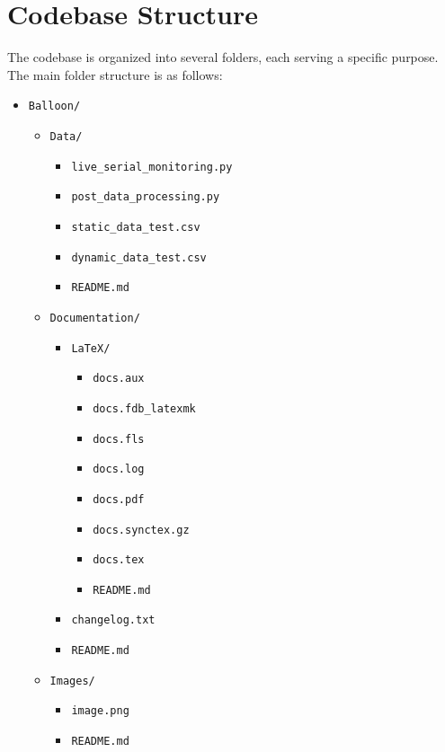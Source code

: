 \documentclass[12pt]{report}
\begin{document}
\section{Codebase Structure}
The codebase is organized into several folders, each serving a specific purpose. The main folder structure is as follows:
\begin{itemize}
    \item \texttt{Balloon/}
    \begin{itemize}
      \item \texttt{Data/}
      \begin{itemize}
        \item \texttt{live\_serial\_monitoring.py}
        \item \texttt{post\_data\_processing.py}
        \item \texttt{static\_data\_test.csv}
        \item \texttt{dynamic\_data\_test.csv}
        \item \texttt{README.md}
      \end{itemize}
      \item \texttt{Documentation/}
      \begin{itemize}
        \item \texttt{LaTeX/}
        \begin{itemize}
          \item \texttt{docs.aux}
          \item \texttt{docs.fdb\_latexmk}
          \item \texttt{docs.fls}
          \item \texttt{docs.log}
          \item \texttt{docs.pdf}
          \item \texttt{docs.synctex.gz}
          \item \texttt{docs.tex}
          \item \texttt{README.md}
        \end{itemize}
        \item \texttt{changelog.txt}
        \item \texttt{README.md}
      \end{itemize}
      \item \texttt{Images/}
      \begin{itemize}
        \item \texttt{image.png}
        \item \texttt{README.md}

\end{itemize}
\end{itemize}
\end{itemize}
\end{document}
